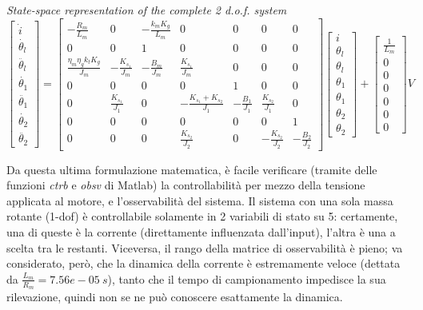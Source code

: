 \textit{State-space representation of the complete 2 d.o.f. system}
\begin{equation}
	\begin{bmatrix}
		\dot{i} \\
		\dot{\theta_l} \\
		\ddot{\theta_l} \\
		\dot{\theta_1} \\
		\ddot{\theta_1} \\
		\dot{\theta_2} \\
		\ddot{\theta_2}
	\end{bmatrix}
	=
	\begin{bmatrix}
		-\frac{R_m}{L_m} & 0 & -\frac{k_m K_g}{L_m} & 0 & 0 & 0 & 0 \\
		0 & 0 &1 & 0 & 0 & 0 & 0 \\
		\frac{\eta_m \eta_g k_t K_g}{J_m} & -\frac{K_{s_1}}{J_m} & -\frac{B_m}{J_m} & \frac{K_{s_1}}{J_m} & 0 & 0 & 0 \\
		0 & 0 & 0 & 0 & 1 & 0 & 0 \\
		0 & \frac{K_{s_1}}{J_1} & 0 & -\frac{K_{s_1}+K_{s_2}}{J_1} & -\frac{B_1}{J_1} & \frac{K_{s_2}}{J_1} & 0 \\
		0 & 0 & 0 & 0 & 0 & 0 & 1 \\
		0 & 0 & 0 & \frac{K_{s_2}}{J_2} & 0 & -\frac{K_{s_2}}{J_2} & -\frac{B_2}{J_2}
	\end{bmatrix}
	\begin{bmatrix}
		i \\
		\theta_l \\
		\theta_l \\
		\theta_1 \\
		\theta_1 \\
		\theta_2 \\
		\theta_2
	\end{bmatrix}
	+
	\begin{bmatrix}
		\frac{1}{L_m} \\
		0 \\
		0 \\
		0 \\
		0 \\
		0 \\
		0
	\end{bmatrix}
	V
\end{equation}

Da questa ultima formulazione matematica, è facile verificare (tramite delle funzioni \textit{ctrb} e \textit{obsv} di Matlab) la controllabilità per mezzo della tensione applicata al motore, e l'osservabilità del sistema.
Il sistema con una sola massa rotante (1-dof) è controllabile solamente in 2 variabili di stato su 5: certamente, una di queste è la corrente (direttamente influenzata dall'input), l'altra è una a scelta tra le restanti. Viceversa, il rango della matrice di osservabilità è pieno; va considerato, però, che la dinamica della corrente è estremamente veloce (dettata da $\frac{L_m}{R_m} = 7.56e-05 \ s$), tanto che il tempo di campionamento impedisce la sua rilevazione, quindi non se ne può conoscere esattamente la dinamica. \\

